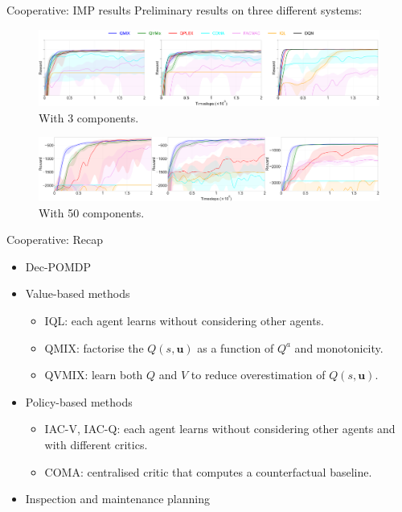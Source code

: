 \documentclass[9pt, hyperref={pdfusetitle,colorlinks=true,allcolors=DarkBlue}]{beamer}
\begin{document}
\begin{frame}{Cooperative: IMP results}
Preliminary results on three different systems:
\begin{figure}
    \centering
    \includegraphics[width=\textwidth]{all_3_cc_False.pdf}
    \caption{With 3 components.}
\end{figure}
\begin{figure}
    \centering
    \includegraphics[width=\textwidth]{all_50_cc_False.pdf}
    \caption{With 50 components.}
\end{figure}
\end{frame}





\begin{frame}{Cooperative: Recap}
\begin{itemize}
    \item Dec-POMDP
    \vfill
    \item Value-based methods
        \begin{itemize}
        \item IQL: each agent learns without considering other agents.
        \item QMIX: factorise the $Q(s,\bm{u})$ as a function of $Q^a$ and monotonicity.
        \item QVMIX: learn both $Q$ and $V$ to reduce overestimation of $Q(s,\bm{u})$.
        \end{itemize}{}
    \vfill
    \item Policy-based methods
        \begin{itemize}
        \item IAC-V, IAC-Q: each agent learns without considering other agents and with different critics.
        \item COMA: centralised critic that computes a counterfactual baseline.
        \end{itemize}{}
    \vfill
    \item Inspection and maintenance planning
\end{itemize}{}
\end{frame}
\end{document}
